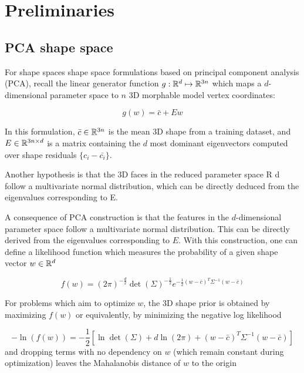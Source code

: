 

\section{Preliminaries}

\subsection{PCA shape space}

For shape spaces shape space formulations based on principal component analysis (PCA), recall the linear generator function $g: {\mathbb{R}^{d}} \mapsto {\mathbb{R}^{3n}}$ which maps a $d$-dimensional parameter space to $n$ 3D morphable model vertex coordinates: 

\begin{equation}
    g(w) = \bar{c} + Ew
\end{equation}

In this formulation, $\bar{c} \in {\mathbb{R}^{3n}}$ is the mean 3D shape from a training dataset, and $E \in {\mathbb{R}^{3n \times d}}$ is a matrix containing the $d$ most dominant eigenvectors computed over shape residuals $\{c_i - \bar{c_i}\}$. 

Another hypothesis is that the 3D faces in the reduced parameter space R
d follow a multivariate normal distribution, which can be directly deduced from the eigenvalues corresponding to E.


A consequence of PCA construction is that the features in the $d$-dimensional parameter space follow a multivariate normal distribution. This can be directly derived from the eigenvalues corresponding to $E$. %
With this construction, one can define a likelihood function which measures the probability of a given shape vector $w \in {\mathbb{R}^{d}}$

\begin{equation}
    f(w) = (2\pi)^{-\frac{d}{2}}\det(\Sigma)^{-\frac{1}{2}}e^{-\frac{1}{2}(w-\bar{c})^T\Sigma^{-1}(w-\bar{c})}
\end{equation}

For problems which aim to optimize $w$, the 3D shape prior is obtained by maximizing $f(w)$ or equivalently, by minimizing the negative log likelihood

\begin{equation}
     -\ln(f(w)) = -\frac{1}{2}\left[\ln\det(\Sigma) + d\ln(2\pi) +  (w - \bar{c})^T\Sigma^{-1}(w-\bar{c})\right]
\end{equation}
and dropping terms with no dependency on $w$ (which remain constant during optimization) leaves the Mahalanobis distance of $w$ to the origin

